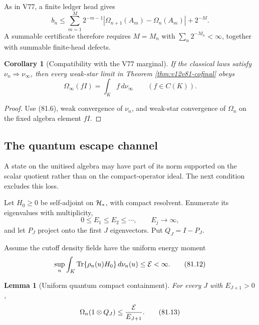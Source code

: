 \documentclass[11pt]{article}
\newtheorem{lemma}[theorem]{Lemma}
\newtheorem{corollary}[theorem]{Corollary}
\theoremstyle{remark}
\begin{document}
As in V77, a finite ledger head gives
\begin{equation}
 b_n\leq
 \sum_{m=1}^{M}2^{-m-1}
 |\Omega_{n+1}(A_m)-\Omega_n(A_m)|
 +2^{-M}.                                                   \tag{81.10}
\end{equation}
A summable certificate therefore requires \(M=M_n\) with
\(\sum_n2^{-M_n}<\infty\), together with summable finite-head
defects.

\begin{corollary}[Compatibility with the V77 marginal]
\label{cor:v12v81-marginal}
If the classical laws satisfy
\(\nu_n\Rightarrow\nu_\infty\), then every weak-star limit in
Theorem \ref{thm:v12v81-cofinal} obeys
\begin{equation}
                 \Omega_\infty(fI)=\int_Kf\,d\nu_\infty
                 \qquad(f\in C(K)).                         \tag{81.11}
\end{equation}
\end{corollary}

\begin{proof}
Use (81.6), weak convergence of \(\nu_n\), and weak-star convergence
of \(\Omega_n\) on the fixed algebra element \(fI\).
\end{proof}

\subsection{The quantum escape channel}

A state on the unitised algebra may have part of its norm supported
on the scalar quotient rather than on the compact-operator ideal.
The next condition excludes this loss.

Let \(H_0\geq0\) be self-adjoint on \({\cal H}_*\), with compact
resolvent.  Enumerate its eigenvalues with multiplicity,
\[
 0\leq E_1\leq E_2\leq\cdots,\qquad E_j\longrightarrow\infty,
\]
and let \(P_J\) project onto the first \(J\) eigenvectors.  Put
\(Q_J=I-P_J\).

Assume the cutoff density fields have the uniform energy moment
\begin{equation}
 \sup_n\int_K
 \operatorname{Tr}\{\rho_n(u)H_0\}\,d\nu_n(u)
 \leq{\cal E}<\infty.                                       \tag{81.12}
\end{equation}

\begin{lemma}[Uniform quantum compact containment]
\label{lem:v12v81-energy-tail}
For every \(J\) with \(E_{J+1}>0\),
\begin{equation}
 \Omega_n(1\otimes Q_J)
 \leq{{\cal E}\over E_{J+1}}.                               \tag{81.13}
\end{equation}
\end{lemma}
\end{document}

